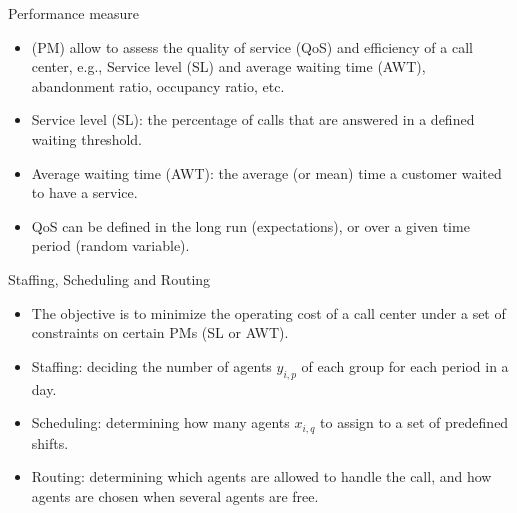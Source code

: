 \documentclass{beamer}
\begin{document}
\begin{frame}{Performance measure}
	\begin{itemize}
		\item{} {\color{blue}{Performance measures} (PM)} allow to assess the quality of service (QoS) and
		efficiency of a call center, e.g., Service level (SL) and average waiting time (AWT), abandonment ratio, occupancy ratio, etc.
		\item {\color{blue}Service level (SL)}: the percentage of calls that are answered in a defined waiting threshold.
		\item {\color{blue}Average waiting time (AWT)}: the average (or mean) time a customer waited to have a service.
		\item{} QoS can be defined in the long run (expectations), or over a given time period (random variable).
	\end{itemize}
\end{frame}

\begin{frame}{Staffing, Scheduling and Routing}
	\begin{itemize}
		\item{} The objective is to minimize the operating cost of a call center under a set of constraints on certain PMs (SL or AWT).
		\item{} Staffing: deciding the number of agents $y_{i,p}$ of each group for each period in a day.
		\item{} Scheduling:  determining how many agents $x_{i,q}$ to assign to a set of predefined shifts.
		\item{} Routing: determining which agents are allowed to handle the call, and how agents are chosen when several agents are free.
		
	\end{itemize}
\end{frame}
\end{document}
